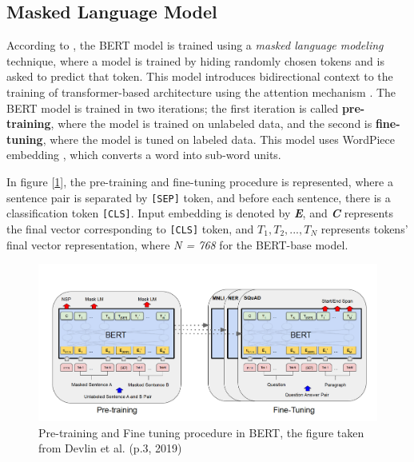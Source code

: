 \documentclass[11pt]{article}
\begin{document}
\subsection{Masked Language Model}
According to \cite{BERT}, the BERT model is trained using a \textit{masked language modeling} technique, where a model is trained by hiding randomly chosen tokens and is asked to predict that token. This model introduces bidirectional context to the training of transformer-based architecture using the attention mechanism \cite{attention}. The BERT model is trained in two iterations; the first iteration is called \textbf{pre-training}, where the model is trained on unlabeled data, and the second is \textbf{fine-tuning}, where the model is tuned on labeled data. This model uses WordPiece embedding \cite{wordpiece}, which converts a word into sub-word units.

In figure [\ref{fig:BERT_archi}], the pre-training and fine-tuning procedure is represented, where a sentence pair is separated by \texttt{[SEP]} token, and before each sentence, there is a classification token \texttt{[CLS]}. Input embedding is denoted by \textbf{\textit{E}}, and \textbf{\textit{C}} represents the final vector corresponding to \texttt{[CLS]} token, and $T_1, T_2, ..., T_N$ represents tokens' final vector representation, where \textit{N = 768} for the BERT-base model.  

\begin{figure}
\label{fig:BERT_embedding}
    \centering
    \includegraphics[scale=0.6]{figures/BERT-embedding.png}
    \caption{Pre-training and Fine tuning procedure in BERT, the figure taken from Devlin et al. (p.3, 2019)}
    \label{fig:BERT_archi}
\end{figure}
\end{document}
